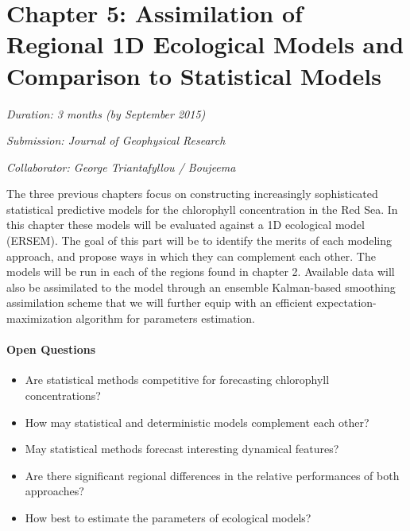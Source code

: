 \section{Chapter 5: Assimilation of Regional 1D Ecological Models and
Comparison to Statistical Models}

\noindent \emph{Duration: 3 months (by September 2015)}

\noindent \emph{Submission: Journal of Geophysical Research}

\noindent \emph{Collaborator: George Triantafyllou / Boujeema}

\vspace{5mm}

The three previous chapters focus on constructing increasingly sophisticated
statistical predictive models for the chlorophyll concentration in the Red Sea.
In this chapter these models will be evaluated against a 1D ecological model
(ERSEM). The goal of this part will be to identify the merits of each modeling
approach, and propose ways in which they can complement each other.  The models
will be run in each of the regions found in chapter 2.  Available data will
also be assimilated to the model through an ensemble Kalman-based smoothing
assimilation scheme that we will further equip with an efficient
expectation-maximization algorithm for parameters estimation.

\paragraph{Open Questions}

\begin{itemize}

\item Are statistical methods competitive for forecasting chlorophyll
concentrations?

\item How may statistical and deterministic models complement each other?

\item May statistical methods forecast interesting dynamical features?

\item Are there significant regional differences in the relative performances
of both approaches?

\item How best to estimate the parameters of ecological models? 

\end{itemize}

